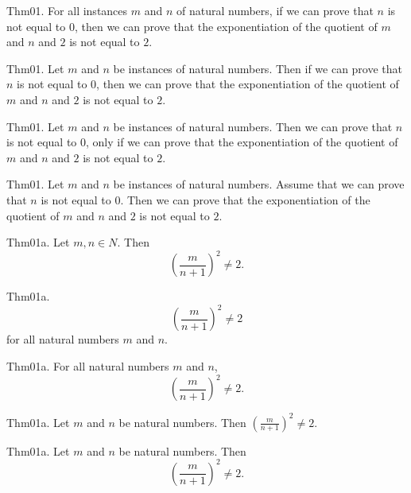 \documentclass{article}
\begin{document}
Thm01. For all instances $m$ and $n$ of natural numbers, if we can prove that $n$ is not equal to $0$, then we can prove that the exponentiation of the quotient of $m$ and $n$ and $2$ is not equal to $2$.

Thm01. Let $m$ and $n$ be instances of natural numbers. Then if we can prove that $n$ is not equal to $0$, then we can prove that the exponentiation of the quotient of $m$ and $n$ and $2$ is not equal to $2$.

Thm01. Let $m$ and $n$ be instances of natural numbers. Then we can prove that $n$ is not equal to $0$, only if we can prove that the exponentiation of the quotient of $m$ and $n$ and $2$ is not equal to $2$.

Thm01. Let $m$ and $n$ be instances of natural numbers. Assume that we can prove that $n$ is not equal to $0$. Then we can prove that the exponentiation of the quotient of $m$ and $n$ and $2$ is not equal to $2$.

Thm01a. Let $m , n \in N$. Then $$(\frac{ m}{n + 1})^ {2}\neq 2.$$

Thm01a. $$(\frac{ m}{n + 1})^ {2}\neq 2$$ for all natural numbers $m$ and $n$.

Thm01a. For all natural numbers $m$ and $n$, $$(\frac{ m}{n + 1})^ {2}\neq 2.$$

Thm01a. Let $m$ and $n$ be natural numbers. Then $(\frac{ m}{n + 1})^ {2}\neq 2$.

Thm01a. Let $m$ and $n$ be natural numbers. Then $$(\frac{ m}{n + 1})^ {2}\neq 2.$$
\end{document}
